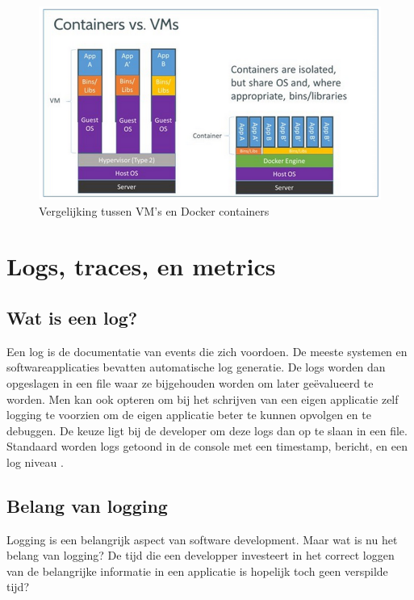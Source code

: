 \begin{figure}[ht]
    \centering
    \includegraphics[scale=0.6]{img/docker-vm-vergelijking}
    \caption[Vergelijking tussen VM's en Docker containers]{Vergelijking tussen VM's en Docker containers \cite{vaughan2018}}
\end{figure}

\section{Logs, traces, en metrics}
\label{sec:log}

\subsection{Wat is een log?}

Een log is de documentatie van events die zich voordoen. De meeste systemen en softwareapplicaties bevatten automatische log generatie. De logs worden dan opgeslagen in een file waar ze bijgehouden worden om later geëvalueerd te worden. Men kan ook opteren om bij het schrijven van een eigen applicatie zelf logging te voorzien om de eigen applicatie beter te kunnen opvolgen en te debuggen. De keuze ligt bij de developer om deze logs dan op te slaan in een file. Standaard worden logs getoond in de console met een timestamp, bericht, en een log niveau \autocite{Techopedia}.

\subsection{Belang van logging}

Logging is een belangrijk aspect van software development. Maar wat is nu het belang van logging? De tijd die een developper investeert in het correct loggen van de belangrijke informatie in een applicatie is hopelijk toch geen verspilde tijd? 

